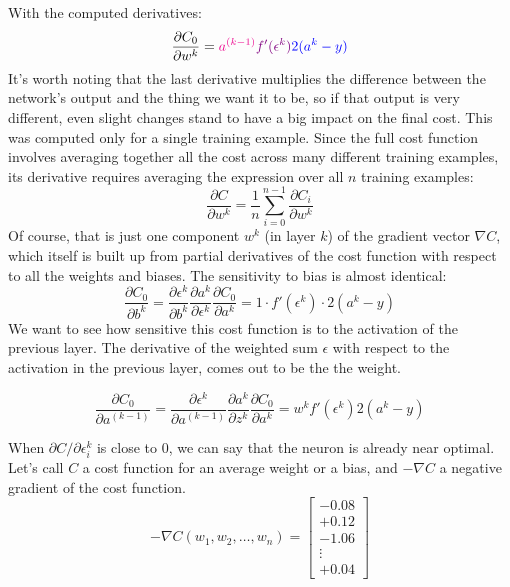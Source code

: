 With the computed derivatives:
\begin{equation}
	\frac{\partial C_0}{\partial w^k} =
	{\color{magenta}a^{(k-1)}}
	{\color{violet}f'(\epsilon^k)}
	{\color{blue}2(a^k - y)}
\end{equation}
It's worth noting that the last derivative multiplies the difference between the network's output and the thing we want it to be, so if that output is very different, even slight changes stand to have a big impact on the final cost.\newline
This was computed only for a single training example. Since the full cost function involves averaging together all the cost across many different training examples, its derivative requires averaging the expression over all $n$ training examples:
\begin{equation*}
	\frac{\partial C}{\partial w^{k}} = \frac{1}{n} \sum_{i=0}^{n-1} \frac{\partial C_i}{\partial w^{k}}
\end{equation*}
Of course, that is just one component $w^k$ (in layer $k$) of the gradient vector $\nabla C$, which itself is built up from partial derivatives of the cost function with respect to all the weights and biases.
The sensitivity to bias is almost identical:
\begin{equation*}
	\frac{\partial C_0}{\partial b^{k}} = \frac{\partial \epsilon^{k}}{\partial b^{k}} \frac{\partial a^{k}}{\partial \epsilon^{k}} \frac{\partial C_0}{\partial a^{k}} = 1 \cdot f'(\epsilon^{k}) \cdot 2(a^{k} - y)
\end{equation*}
We want to see how sensitive this cost function is to the activation of the previous layer. The derivative of the weighted sum $\epsilon$ with respect to the activation in the previous layer, comes out to be the the weight.

\begin{equation*}
	\frac{\partial C_0}{\partial a^{(k-1)}} = \frac{\partial \epsilon^{k}}{\partial a^{(k-1)}} \frac{\partial a^{k}}{\partial z^{k}} \frac{\partial C_0}{\partial a^{k}} = w^{k} f'(\epsilon^{k}) 2(a^{k} - y)
\end{equation*}


When $\partial C / \partial \epsilon_i^k$ is close to 0, we can say that the neuron is already near optimal.
Let's call $C$ a cost function for an average weight or a bias, and $-\nabla C$ a negative gradient of the cost function. 
\begin{equation}
	-\nabla C(w_1, w_2, \dots, w_{n}) = 
	\begin{bmatrix}
		-0.08 \\
		+0.12 \\
		-1.06 \\
		\vdots \\
		+0.04
	\end{bmatrix}
	\label{eq:nabla}
\end{equation}


